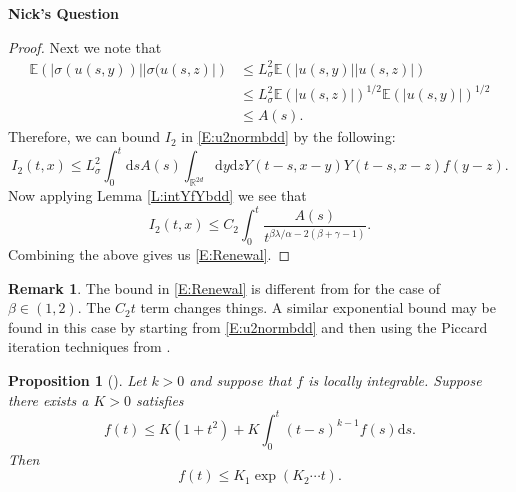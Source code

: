 \documentclass[a4paper,11pt]{article}
\numberwithin{equation}{section}
\theoremstyle{plain}
\newtheorem{proposition}[theorem]{Proposition}
\theoremstyle{definition}
\newtheorem{remark}[theorem]{Remark}
\newcommand{\ud}{\ensuremath{\mathrm{d} }}
\newcommand{\R}{\mathbb{R}}
\newcounter{NQ}
\newenvironment{NickQuestion}[1][] %
{\refstepcounter{NQ}
	\begin{mdframed}[backgroundcolor=lightgray]\textbf{Nick's Question \theNQ \: #1~~}~~~\noindent}%
	{\end{mdframed}}
\numberwithin{NQ}{section}
\numberwithin{LQ}{section}
\numberwithin{ZQ}{section}
\begin{document}
\begin{NickQuestion}
\begin{proof}
			Next we note that 
			\begin{align*}
			\mathbb{E}\left( |\sigma(u(s,y))||\sigma(u(s,z)| \right) &\le L^2_{\sigma} \mathbb{E}\left( |u(s,y)||u(s,z)| \right) \\
			& \le L^2_{\sigma} \mathbb{E}\left(|u(s,z)| \right)^{1/2}\mathbb{E}\left( |u(s,y)| \right)^{1/2} \\
			& \le A(s).
			\end{align*}
			Therefore, we can bound $I_2$ in \eqref{E:u2normbdd} by the following:
			\[
			I_2(t,x) \le L^2_{\sigma}\int_0^t \ud s A(s) \int_{\R^{2d}} \ud y \ud z Y(t-s,x-y)Y(t-s,x-z)f(y-z).
			\]
			Now applying Lemma \ref{L:intYfYbdd} we see that 
			\[
			I_2(t,x) \le C_2 \int_0^t \frac{A(s)}{t^{\beta \lambda / \alpha - 2(\beta + \gamma -1)}}.
			\]
			Combining the above gives us \eqref{E:Renewal}.
		\end{proof}
		
		\begin{remark}
			The bound in \eqref{E:Renewal} is different from \cite[Proposition 2.12]{FN2016} for the case of $\beta \in (1,2)$. The $C_2t$ term changes things. A similar exponential bound may be found in this case by starting from \eqref{E:u2normbdd} and then using the Piccard iteration techniques from \cite[Lemma 2.2]{CH2017}.
		\end{remark}
		
		\begin{proposition}[{\normalfont \cite[Proposition 2.12]{FN2016}}]
			Let $k>0$ and suppose that $f$ is locally integrable. Suppose there exists a $K>0$ satisfies 
			\begin{equation}
			\label{E:fRenew}
			f(t) \le K(1+t^2) + K\int_0^t (t-s)^{k-1} f(s) \ud s.
			\end{equation}
			Then 	
			\begin{equation}
			f(t) \le K_1\exp\left( K_2 \cdots t \right).
			\end{equation}
		\end{proposition}
		

\end{NickQuestion}
\end{document}

